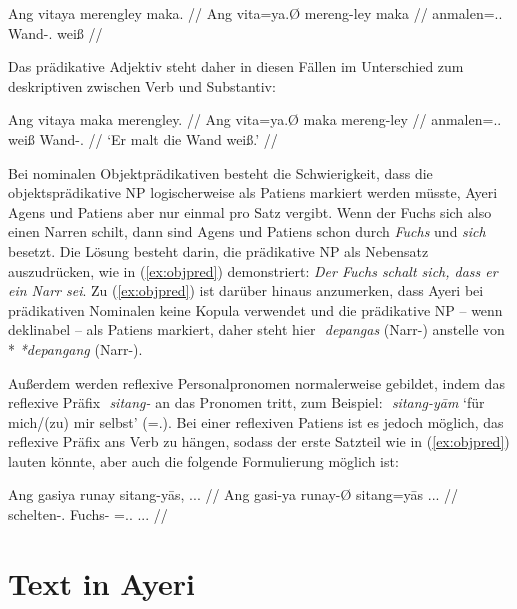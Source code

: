 \documentclass[12pt,paper=a4]{scrartcl}
\newcommand{\PargI}{{\Parg}.{\Inan}}
\newcommand{\TsgM}{{\Tsg}.{\M}}
\newcommand{\fw}[1]{\textit{#1}} %
\newcommand{\zwsp}{\mbox{​}} %
\newcommand{\rayr}[2]{\zwsp\smash{{\Tagati #1}} \emph{#2}} %
\newcommand{\xayr}[3]{\zwsp\smash{\Tagati #1} \emph{#2} `#3'} %
\begin{document}
\exdisplay[everygl=\hspace*{1em}]\noexno
\begingl
	\gla Ang vitaya merengley maka. //
	\glb Ang vita=ya.Ø mereng-ley maka //
	\glc \AgtT{} anmalen=\TsgM{}.\Top{} Wand-\PargI{} weiß //
\endgl
\xe

Das prädikative Adjektiv steht daher in diesen Fällen im Unterschied zum deskriptiven zwischen Verb und Substantiv:

\exdisplay[everygl=\hspace*{1em}]\noexno
\begingl
	\gla Ang vitaya maka merengley. //
	\glb Ang vita=ya.Ø maka mereng-ley //
	\glc \AgtT{} anmalen=\TsgM{}.\Top{} weiß Wand-\PargI{} //
	\glft `Er malt die Wand weiß.' //
\endgl
\xe

Bei nominalen Objektprädikativen besteht die Schwierigkeit, dass die objektsprädikative NP logischerweise als Patiens markiert werden müsste, Ayeri Agens und Patiens aber nur einmal pro Satz vergibt. Wenn der Fuchs sich also einen Narren schilt, dann sind Agens und Patiens schon durch \fw{Fuchs} und \fw{sich} besetzt. Die Lösung besteht darin, die prädikative NP als Nebensatz auszudrücken, wie in (\ref{ex:objpred}) demonstriert: \fw{Der Fuchs schalt sich, dass er ein Narr sei}. Zu (\ref{ex:objpred}) ist darüber hinaus anzumerken, dass Ayeri bei prädikativen Nominalen keine Kopula verwendet und die prädikative NP -- wenn deklinabel -- als Patiens markiert, daher steht hier \rayr{depNsF}{depangas} (Narr-\Parg{}) anstelle von *\rayr{depNNF}{*depangang} (Narr-\Aarg{}).

Außerdem werden reflexive Personalpronomen normalerweise gebildet, indem das reflexive Präfix \rayr{sitNF/}{sitang-} an das Pronomen tritt, zum Beispiel: \xayr{sitNF/yaamF}{sitang-yām}{für mich/(zu) mir selbst} (\Refl{}=\Fsg{}.\Dat{}). Bei einer reflexiven Patiens ist es jedoch möglich, das reflexive Präfix ans Verb zu hängen, sodass der erste Satzteil wie in (\ref{ex:objpred}) lauten könnte, aber auch die folgende Formulierung möglich ist:

\exdisplay[everygl=\hspace*{1em}]\noexno
\begingl
	\gla Ang gasiya runay sitang-yās, ... //
	\glb Ang gasi-ya runay-Ø sitang=yās ... //
	\glc \AgtT{} schelten-\TsgM{} Fuchs-\Top{} \Refl{}=\TsgM{}.\Parg{} ... //
\endgl
\xe

\section{Text in Ayeri}
\end{document}

